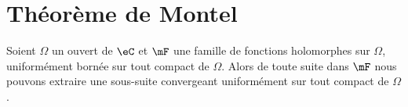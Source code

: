 \section{Théorème de Montel}

\begin{theorem}   \label{ThoXLyCzol}
    Soient \( \Omega\) un ouvert de \( \eC\) et \( \mF\) une famille de fonctions holomorphes sur \( \Omega\), uniformément bornée sur tout compact de \( \Omega\). Alors de toute suite dans \( \mF\) nous pouvons extraire une sous-suite convergeant uniformément sur tout compact de \( \Omega\).
\end{theorem}

